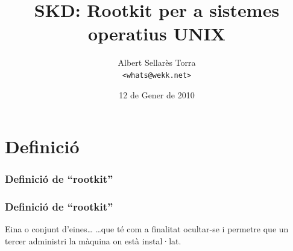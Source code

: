 \documentclass{beamer}
\title{SKD: Rootkit per a sistemes operatius UNIX}
\author{Albert Sellarès Torra \\ \texttt{<whats@wekk.net>}}
\institute{Facultat d'Informàtica de Barcelona}
\date{12 de Gener de 2010}
\begin{document}
\frame{\titlepage}

\frame{\tableofcontents}
%
%
%
%

\section{Definició}
\begin{frame}
	\frametitle{Definició de ``rootkit''}
\end{frame}

\begin{frame}
	\frametitle{Definició de ``rootkit''}
	\begin{block}{Eina o conjunt d'eines\ldots}
		\ldots que té com a finalitat ocultar-se i permetre que un tercer administri la màquina on està 
		instal·lat.
	\end{block}
\end{frame}

\end{document}
